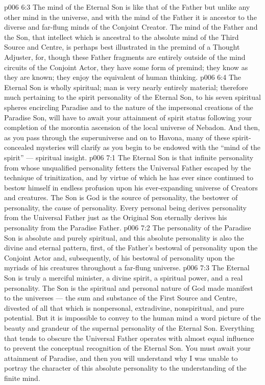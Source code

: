 \vs p006 6:3 The mind of the Eternal Son is like that of the Father but unlike any other mind in the universe, and with the mind of the Father it is ancestor to the diverse and far\hyp{}flung minds of the Conjoint Creator. The mind of the Father and the Son, that intellect which is ancestral to the absolute mind of the Third Source and Centre, is perhaps best illustrated in the premind of a Thought Adjuster, for, though these Father fragments are entirely outside of the mind circuits of the Conjoint Actor, they have some form of premind; they know as they are known; they enjoy the equivalent of human thinking.
\vs p006 6:4 The Eternal Son is wholly spiritual; man is very nearly entirely material; therefore much pertaining to the spirit personality of the Eternal Son, to his seven spiritual spheres encircling Paradise and to the nature of the impersonal creations of the Paradise Son, will have to await your attainment of spirit status following your completion of the morontia ascension of the local universe of Nebadon. And then, as you pass through the superuniverse and on to Havona, many of these spirit\hyp{}concealed mysteries will clarify as you begin to be endowed with the “mind of the spirit” --- spiritual insight.
\vs p006 7:1 The Eternal Son is that infinite personality from whose unqualified personality fetters the Universal Father escaped by the technique of trinitization, and by virtue of which he has ever since continued to bestow himself in endless profusion upon his ever\hyp{}expanding universe of Creators and creatures. The Son is  God is  the source of personality, the bestower of personality, the cause of personality. Every personal being derives personality from the Universal Father just as the Original Son eternally derives his personality from the Paradise Father.
\vs p006 7:2 The personality of the Paradise Son is absolute and purely spiritual, and this absolute personality is also the divine and eternal pattern, first, of the Father’s bestowal of personality upon the Conjoint Actor and, subsequently, of his bestowal of personality upon the myriads of his creatures throughout a far\hyp{}flung universe.
\vs p006 7:3 The Eternal Son is truly a merciful minister, a divine spirit, a spiritual power, and a real personality. The Son is the spiritual and personal nature of God made manifest to the universes --- the sum and substance of the First Source and Centre, divested of all that which is nonpersonal, extradivine, nonspiritual, and pure potential. But it is impossible to convey to the human mind a word picture of the beauty and grandeur of the supernal personality of the Eternal Son. Everything that tends to obscure the Universal Father operates with almost equal influence to prevent the conceptual recognition of the Eternal Son. You must await your attainment of Paradise, and then you will understand why I was unable to portray the character of this absolute personality to the understanding of the finite mind.
